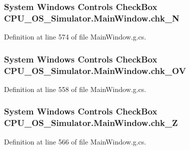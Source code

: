 \subsubsection[{chk\+\_\+\+N}]{\setlength{\rightskip}{0pt plus 5cm}System Windows Controls Check\+Box C\+P\+U\+\_\+\+O\+S\+\_\+\+Simulator.\+Main\+Window.\+chk\+\_\+\+N\hspace{0.3cm}{\ttfamily [package]}}\label{class_c_p_u___o_s___simulator_1_1_main_window_ab8a23e33c5c71e359574de36ccf8d991}


Definition at line 574 of file Main\+Window.\+g.\+cs.

\hypertarget{class_c_p_u___o_s___simulator_1_1_main_window_adfbc519740506214093673b8015ea67d}{}
\subsubsection[{chk\+\_\+\+O\+V}]{\setlength{\rightskip}{0pt plus 5cm}System Windows Controls Check\+Box C\+P\+U\+\_\+\+O\+S\+\_\+\+Simulator.\+Main\+Window.\+chk\+\_\+\+O\+V\hspace{0.3cm}{\ttfamily [package]}}\label{class_c_p_u___o_s___simulator_1_1_main_window_adfbc519740506214093673b8015ea67d}


Definition at line 558 of file Main\+Window.\+g.\+cs.

\hypertarget{class_c_p_u___o_s___simulator_1_1_main_window_a70c1a75df218201391cf5e0615a600f1}{}
\subsubsection[{chk\+\_\+\+Z}]{\setlength{\rightskip}{0pt plus 5cm}System Windows Controls Check\+Box C\+P\+U\+\_\+\+O\+S\+\_\+\+Simulator.\+Main\+Window.\+chk\+\_\+\+Z\hspace{0.3cm}{\ttfamily [package]}}\label{class_c_p_u___o_s___simulator_1_1_main_window_a70c1a75df218201391cf5e0615a600f1}


Definition at line 566 of file Main\+Window.\+g.\+cs.

